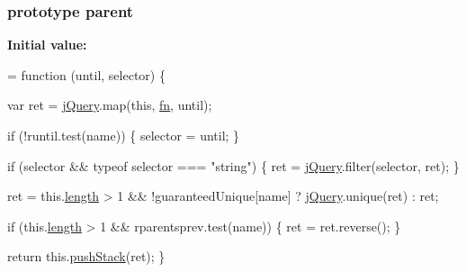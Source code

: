 \subsubsection[{\texorpdfstring{parent}{parent}}]{ {\bf prototype} parent}\hypertarget{jquery-2_82_81-vsdoc_8js_aed9b5e7a755bcccb282f9b06c00a6822}{}\label{jquery-2_82_81-vsdoc_8js_aed9b5e7a755bcccb282f9b06c00a6822}
{\bfseries Initial value\+:}
\begin{DoxyCode}
= \textcolor{keyword}{function} (until, selector) \{
        

        var ret = \hyperlink{jquery-2_82_81-vsdoc_8js_add5237586d970a38a81f990e8eb28c6c}{jQuery}.map(\textcolor{keyword}{this}, \hyperlink{jquery-2_82_81-vsdoc_8js_acef6bdaf6b9b20fdcca1ea86f0902c3b}{fn}, until);

        \textcolor{keywordflow}{if} (!runtil.test(name)) \{
            selector = until;
        \}

        \textcolor{keywordflow}{if} (selector && typeof selector === \textcolor{stringliteral}{"string"}) \{
            ret = \hyperlink{jquery-2_82_81-vsdoc_8js_add5237586d970a38a81f990e8eb28c6c}{jQuery}.filter(selector, ret);
        \}

        ret = this.\hyperlink{jquery-2_82_81-vsdoc_8js_aa7de35d58da66d9944ab9cbe82c19640}{length} > 1 && !guaranteedUnique[name] ? \hyperlink{jquery-2_82_81-vsdoc_8js_add5237586d970a38a81f990e8eb28c6c}{jQuery}.unique(ret) : ret;

        \textcolor{keywordflow}{if} (this.\hyperlink{jquery-2_82_81-vsdoc_8js_aa7de35d58da66d9944ab9cbe82c19640}{length} > 1 && rparentsprev.test(name)) \{
            ret = ret.reverse();
        \}

        \textcolor{keywordflow}{return} this.\hyperlink{jquery-2_82_81-vsdoc_8js_afc3a7db1ef2b526338c06c07cecccd44}{pushStack}(ret);
    \}
\end{DoxyCode}
